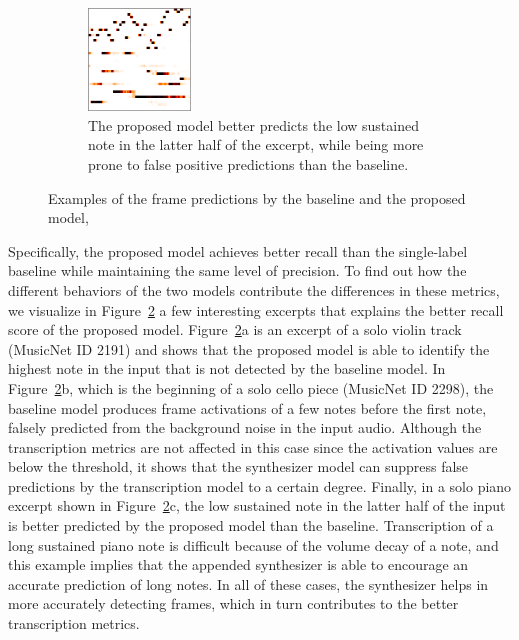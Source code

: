\begin{figure}
\begin{subfigure}[b]{\textwidth}
		\includegraphics[width=0.3\textwidth]{cropped/2303-proposed.png}
		\caption{The proposed model better predicts the low sustained note in the latter half of the excerpt, while being more prone to false positive predictions than the baseline.}
		\label{}
	\end{subfigure}
	\caption{Examples of the frame predictions by the baseline and the proposed model, }\label{fig:frame-prediction-excerpts}
\end{figure}

Specifically, the proposed model achieves better recall than the single-label baseline while maintaining the same level of precision.
To find out how the different behaviors of the two models contribute the differences in these metrics, we visualize in Figure~\ref{fig:frame-prediction-excerpts} a few interesting excerpts that explains the better recall score of the proposed model.
Figure~\ref{fig:frame-prediction-excerpts}a is an excerpt of a solo violin track (MusicNet ID 2191) and shows that the proposed model is able to identify the highest note in the input that is not detected by the baseline model.
In Figure~\ref{fig:frame-prediction-excerpts}b, which is the beginning of a solo cello piece (MusicNet ID 2298), the baseline model produces frame activations of a few notes before the first note, falsely predicted from the background noise in the input audio.
Although the transcription metrics are not affected in this case since the activation values are below the threshold, it shows that the synthesizer model can suppress false predictions by the transcription model to a certain degree.
Finally, in a solo piano excerpt shown in Figure~\ref{fig:frame-prediction-excerpts}c, the low sustained note in the latter half of the input is better predicted by the proposed model than the baseline.
Transcription of a long sustained piano note is difficult because of the volume decay of a note, and this example implies that the appended synthesizer is able to encourage an accurate prediction of long notes.
In all of these cases, the synthesizer helps in more accurately detecting frames, which in turn contributes to the better transcription metrics.


